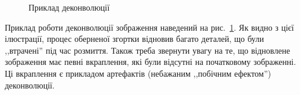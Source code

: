 \documentclass{diploma}
\begin{document}
      \begin{figure}
        \hfill
        \hfill
        \caption{Приклад деконволюції}
        \label{fig:deconvolution-example}
      \end{figure}

      Приклад роботи деконволюції зображення наведений на
      рис.~\ref{fig:deconvolution-example}.
      Як видно з цієї ілюстрації, процес оберненої згортки відновив багато
      деталей, що були ,,втрачені'' під час розмиття.
      Також треба звернути увагу на те, що відновлене зображення має певні
      вкраплення, які були відсутні на початковому зображенні.
      Ці вкраплення є прикладом артефактів (небажаним ,,побічним ефектом'')
      деконволюції.\cite{deconvolve-index}
\end{document}
